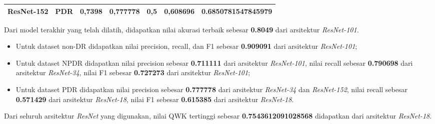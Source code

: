 \begin{table}[hbtp]
\begin{center}
\begin{tabular}{|c|l|c|l|l|l|c|}
			\multirow{-3}{*}{ResNet-152} & PDR                                                & \multirow{-3}{*}{0,7398} & \textbf{0,777778}                                          & 0,5                                              & 0,608696                                        & \multirow{-3}{*}{0.6850781547845979} \\ \hline
		\end{tabular}
	\end{center}
\end{table}

Dari model terakhir yang telah dilatih, didapatkan nilai akurasi terbaik sebesar \textbf{0.8049} dari arsitektur \emph{ResNet-101}.

\begin{itemize}
	
	\item Untuk dataset non-DR didapatkan nilai precision, recall, dan F1 sebesar \textbf{0.909091} dari arsitektur \emph{ResNet-101};
	
	\item Untuk dataset NPDR didapatkan nilai precision sebesar \textbf{0.711111} dari arsitektur \emph{ResNet-101}, nilai recall sebesar \textbf{0.790698} dari arsitektur \emph{ResNet-34}, nilai F1 sebesar \textbf{0.727273} dari arsitektur \emph{ResNet-101};
	
	\item Untuk dataset PDR didapatkan nilai precision sebesar \textbf{0.777778} dari arsitektur \emph{ResNet-34} dan \emph{ResNet-152}, nilai recall sebesar \textbf{0.571429} dari arsitektur \emph{ResNet-18}, nilai F1 sebesar \textbf{0.615385} dari arsitektur \emph{ResNet-18}.
	
\end{itemize}

Dari seluruh arsitektur \emph{ResNet} yang digunakan, nilai QWK tertinggi sebesar \textbf{0.7543612091028568} didapatkan dari arsitektur \emph{ResNet-18}.

